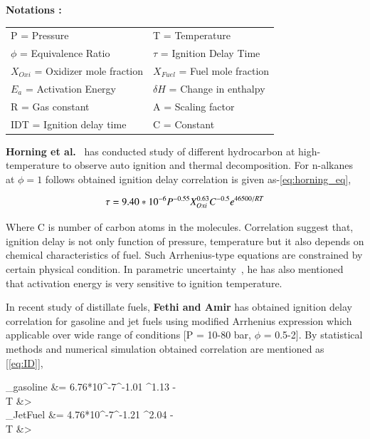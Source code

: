 \documentclass[preprint,12pt]{elsarticle}
\begin{document}
			\vspace{2 mm}
			\textbf{Notations :}
			
			\begin{table}[htpb!]\label{table:Notation}
				\begin{tabular}{ l l }	
					P = Pressure &	T = Temperature \\
					$\phi$ = Equivalence Ratio & $\tau$ = Ignition Delay Time \\
					$X_{Oxi}$ = Oxidizer mole fraction &  $X_{Fuel}$ = Fuel mole fraction   \\
					$E_a$ = Activation Energy & $\delta H$ = Change in enthalpy \\
					R = Gas constant & 		A = Scaling factor \\
					IDT = Ignition delay time & C = Constant \\
				\end{tabular}
			\end{table}
			
				
		\textbf{Horning et al.}~\cite{horning} has conducted study of different hydrocarbon at high-temperature to observe auto ignition and thermal decomposition. For n-alkanes at $\phi =1$ follows obtained ignition delay correlation is given as-\ref{eq:horning_eq},
		
		\begin{equation}\label{eq:horning_eq}
		\tau = 9.40  * \space 10^{-6} P^{-0.55} X_{Oxi}^{0.63} C^{-0.5} e^{46500/RT}
		\end{equation}
		
		Where C is number of carbon atoms in the molecules. Correlation suggest that, ignition delay is not only function of pressure, temperature but it also depends on chemical characteristics of fuel. Such Arrhenius-type equations are constrained by certain physical condition. In parametric uncertainty~\cite{horning}, he has also mentioned that activation energy is very sensitive to ignition temperature. 
		
		In recent study of distillate fuels, \textbf{Fethi and Amir} \cite{khaled2019universality} has obtained ignition delay correlation for gasoline and jet fuels using modified Arrhenius expression which applicable over wide range of conditions  [P = 10-80 bar, $\phi$ = 0.5-2]. By statistical methods  and  numerical simulation obtained correlation  are mentioned as [\ref{eq:ID}],	
		
		\begin{flalign} \label{eq:ID}
		\tau_{gasoline} &= 6.76*10^-7^{-1.01} \phi^{1.13 - } \\		
		 T &> \\
		\tau_{JetFuel} &= 4.76*10^-7^{-1.21} \phi^{2.04 - } \\			\newline
		 T &> 
		\end{flalign}
		
\end{document}
